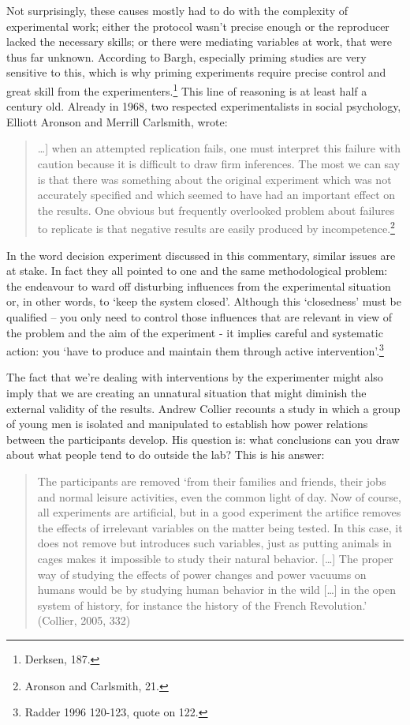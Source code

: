 \documentclass[twocolumn, serif, review, authordate]{jote-article}
\begin{document}
Not surprisingly, these causes mostly had to do with the complexity of experimental work; either the protocol wasn't precise enough or the reproducer lacked the necessary skills; or there were mediating variables at work, that were thus far unknown. According to Bargh, especially priming studies are very sensitive to this, which is why priming experiments require precise control and great skill from the experimenters.\footnote{ Derksen, 187.} This line of reasoning is at least half a century old. Already in 1968, two respected experimentalists in social psychology, Elliott Aronson and Merrill Carlsmith, wrote:

\blockquote{{\dots}] when an attempted replication fails, one must interpret this failure with caution because it is difficult to draw firm inferences. The most we can say is that there was something about the original experiment which was not accurately specified and which seemed to have had an important effect on the results. One obvious but frequently overlooked problem about failures to replicate is that negative results are easily produced by incompetence.\footnote{ Aronson and Carlsmith, 21.}}

In the word decision experiment discussed in this commentary, similar issues are at stake. In fact they all pointed to one and the same methodological problem: the endeavour to ward off disturbing influences from the experimental situation or, in other words, to `keep the system closed'. Although this `closedness' must be qualified -- you only need to control those influences that are relevant in view of the problem and the aim of the experiment - it implies careful and systematic action: you `have to produce and maintain them through active intervention'.\footnote{ Radder 1996 120-123, quote on 122.} 
 
The fact that we're dealing with interventions by the experimenter might also imply that we are creating an unnatural situation that might diminish the external validity of the results. Andrew Collier recounts a study in which a group of young men is isolated and manipulated to establish how power relations between the participants develop. His question is: what conclusions can you draw about what people tend to do outside the lab? This is his answer:

\begin{quote}

The participants are removed `from their families and friends, their jobs and normal leisure activities, even the common light of day. Now of course, all experiments are artificial, but in a good experiment the artifice removes the effects of irrelevant variables on the matter being tested. In this case, it does not remove but introduces such variables, just as putting animals in cages makes it impossible to study their natural behavior. [{\dots}] The proper way of studying the effects of power changes and power vacuums on humans would be by studying human behavior in the wild [{\dots}] in the open system of history, for instance the history of the French Revolution.' (Collier, 2005, 332)

\end{quote}
\end{document}

